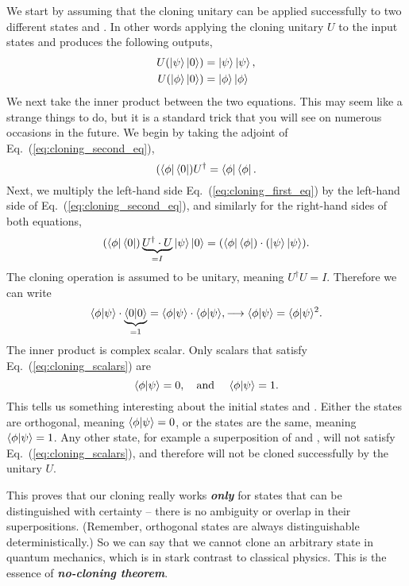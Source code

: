 We start by assuming that the cloning unitary can be applied successfully to two different states \ket{\psi} and \ket{\phi}.
In other words applying the cloning unitary $U$ to the input states \ket{\psi} and \ket{\phi} produces the following outputs,
\begin{align}
    U(\left| \psi \right\rangle\left| 0 \right\rangle) & = \left| \psi \right\rangle\left| \psi \right\rangle, \label{eq:cloning_first_eq}\\
    U(\left| \phi \right\rangle\left| 0 \right\rangle) & = \left| \phi \right\rangle\left| \phi \right\rangle \label{eq:cloning_second_eq}
\end{align}
We next take the inner product between the two equations.
This may seem like a strange things to do, but it is a standard trick that you will see on numerous occasions in the future.
We begin by taking the adjoint of Eq.~(\ref{eq:cloning_second_eq}),
\begin{equation}
    (\left\langle \phi \right|\left\langle 0 \right|) U^{\dagger} = \left\langle \phi \right|\left\langle \phi \right|. 
\end{equation}
Next, we multiply the left-hand side Eq.~(\ref{eq:cloning_first_eq}) by the left-hand side of Eq.~(\ref{eq:cloning_second_eq}), and similarly for the right-hand sides of both equations,
\begin{equation}
    (\left\langle \phi \right|\left\langle 0 \right|) \underbrace{U^{\dagger} \cdot U}_{=I} \left| \psi \right\rangle\left| 0 \right\rangle = (\left\langle \phi \right|\left\langle \phi \right|) \cdot (\left| \psi \right\rangle\left| \psi \right\rangle).
\end{equation}
The cloning operation is assumed to be unitary, meaning $U^{\dagger}U=I$.
Therefore we can write
\begin{equation}
    \langle \phi|\psi \rangle \cdot \underbrace{\langle 0|0 \rangle}_{=1} = \langle \phi|\psi \rangle \cdot \langle \phi|\psi \rangle, \longrightarrow
    \langle \phi|\psi \rangle = \langle \phi|\psi \rangle^2.
    \label{eq:cloning_scalars}
\end{equation}
The inner product \braket{\phi}{\psi} is complex scalar.
Only scalars that satisfy Eq.~(\ref{eq:cloning_scalars}) are
\begin{equation}
    \langle \phi|\psi \rangle = 0, \quad \text{and } \quad \langle \phi|\psi \rangle = 1.
\end{equation}
This tells us something interesting about the initial states \ket{\psi} and \ket{\phi}.
Either the states are orthogonal, meaning $\langle \phi|\psi \rangle=0$, or the states are the same, meaning $\langle \phi|\psi \rangle=1$.
Any other state, for example a superposition of \ket{\psi} and \ket{\phi}, will not satisfy Eq.~(\ref{eq:cloning_scalars}), and therefore will not be cloned successfully by the unitary $U$.

This proves that our cloning really works \textbf{\emph{only}} for states that can be distinguished with certainty -- there is no ambiguity or overlap in their superpositions.
(Remember, orthogonal states are always distinguishable deterministically.)
So we can say that we cannot clone an arbitrary state in quantum mechanics, which is in stark contrast to classical physics.
This is the essence of \textbf{\emph{no-cloning theorem}}.


